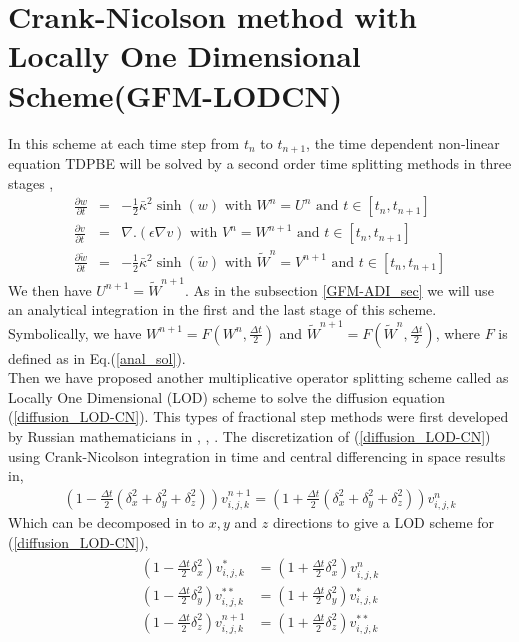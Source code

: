 \section{Crank-Nicolson method with Locally One Dimensional Scheme(GFM-LODCN)}\label{GFM-LODCN}
In this scheme at each time step from $t_n$ to $t_{n+1}$, the time dependent non-linear equation TDPBE will be solved by a second order time splitting methods in three stages \cite{Yu2005},
\begin{eqnarray}
  \frac{\partial w}{\partial t}&=& -\frac{1}{2}\bar\kappa^2 \sinh(w) \text{ with } W^n=U^n\text{ and } t \in \left[t_n,t_{n+1}\right]\label{non_linear1_LOD-CN}\\
 \frac{\partial v}{\partial t}&=&  \nabla . (\epsilon\nabla v) \text{    with } V^n=W^{n+1}\text{ and } t \in \left[t_n,t_{n+1}\right]	 \label{diffusion_LOD-CN}\\
 \frac{\partial \tilde{w}}{\partial t}&=& -\frac{1}{2}\bar\kappa^2 \sinh( \tilde{w}) \text{ with } \tilde{W}^n=V^{n+1}\text{ and } t \in \left[t_n,t_{n+1}\right]\label{non_linear2_LOD-CN}
\end{eqnarray}
We then have $U^{n+1}=\tilde{W}^{n+1}$. As in the subsection \ref{GFM-ADI_sec} we will use an analytical integration in the first and the last stage of this scheme. Symbolically, we have $W^{n+1}=F(W^n,\frac{\Delta t}{2})$ and $\tilde{W}^{n+1}=F(\tilde{W}^n,\frac{\Delta t}{2})$, where $F$ is defined as in Eq.(\ref{anal_sol}).\\
Then we have proposed another multiplicative operator splitting scheme called as Locally One Dimensional (LOD) scheme to solve the diffusion equation (\ref{diffusion_LOD-CN}). This types of fractional step methods were first developed by Russian mathematicians in \cite{Yakonov_1963}, \cite{Yanenko_1963}, \cite{Yanenko_1967}. The discretization of (\ref{diffusion_LOD-CN}) using Crank-Nicolson integration in time and central differencing in space results in, 
\begin{eqnarray}
	\left(1-\frac{\Delta t}{2}(\delta^2_x+\delta^2_y+\delta^2_z)\right)v_{i,j,k}^{n+1}=\left(1+\frac{\Delta t}{2}(\delta^2_x+\delta^2_y+\delta^2_z)\right)v_{i,j,k}^n
\end{eqnarray}
Which can be decomposed in to $x,y$ and $z$ directions to give a LOD scheme for (\ref{diffusion_LOD-CN}),
\begin{eqnarray}
	\begin{aligned}
	\left(1-\frac{\Delta t}{2}\delta_x^2\right)v^*_{i,j,k}&=\left(1+\frac{\Delta t}{2}\delta_x^2\right)v^n_{i,j,k}\\
	\left(1-\frac{\Delta t}{2}\delta_y^2\right)v^{**}_{i,j,k}&=\left(1+\frac{\Delta t}{2}\delta_y^2\right)v^*_{i,j,k}\\
	\left(1-\frac{\Delta t}{2}\delta_z^2\right)v^{n+1}_{i,j,k}&=\left(1+\frac{\Delta t}{2}\delta_z^2\right)v^{**}_{i,j,k}\label{LODCN_eq}
	\end{aligned}
\end{eqnarray}

